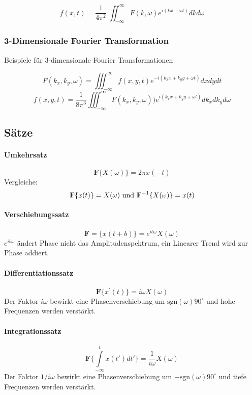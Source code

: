 \[
f(x,t)=\frac{1}{4\pi^2}\ \iint_{-\infty}^\infty F(k,\omega)e^{i(kx+\omega t)} dk d\omega
\]

\subsubsection{3-Dimensionale Fourier Transformation}
Beispiele für 3-dimensionale Fourier Transformationen

\[
F(k_x,k_y,\omega)=\iiint_{-\infty}^\infty f(x,y,t)e^{-i(k_xx+k_yy+\omega t)} dx dy dt
\]
\[
f(x,y,t)=\frac{1}{8\pi^3} \iiint_{-\infty}^\infty F(k_x,k_y,\omega))e^{i(k_xx+k_yy+\omega t)} dk_x dk_y d\omega
\]


\subsection{Sätze}

\paragraph{Umkehrsatz}
\begin{equation}
\textbf{F} \{X(\omega)\}=2\pi x(-t)
\end{equation}
Vergleiche:
\[
{\bf F} \{x(t)\}=X(\omega) \mbox{ und } {\bf F}^{-1}\{X(\omega)\}=x(t)
\]


\paragraph{Verschiebungssatz}
\begin{equation}
\textbf{F} = \{x(t+b)\}=e^{ib\omega}X(\omega)
\end{equation}
$e^{ib\omega}$ ändert Phase nicht das Amplitudenspektrum, ein Linearer Trend wird zur Phase addiert.


\paragraph{Differentiationssatz}
\begin{equation}
\textbf{F}\{x^\prime(t)\}=i\omega X(\omega)
\end{equation}
Der Faktor $i \omega$ bewirkt eine Phasenverschiebung um $\mbox{sgn}(\omega) 90^\circ$ und hohe Frequenzen werden verstärkt.

\paragraph{Integrationssatz}
\begin{equation}
\textbf{F} \{\int\limits_{-\infty}^{t} x(t')dt'\}=\frac{1}{i\omega} X(\omega)
\end{equation}
Der Faktor $1/i\omega$ bewirkt eine Phasenverschiebung um $-\mbox{sgn}(\omega) 90^\circ$ und tiefe Frequenzen werden verstärkt.

